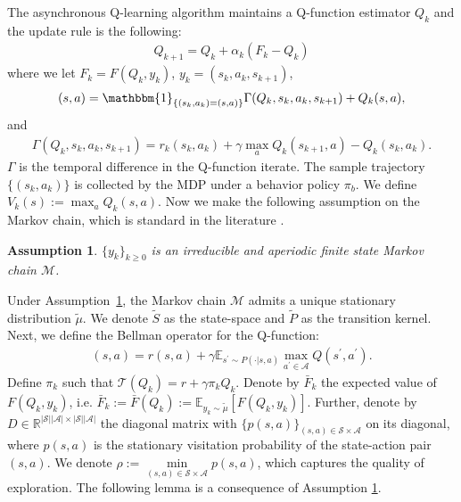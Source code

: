 \documentclass{opt2025} %
\newtheorem{assumption}[theorem]{Assumption}
\begin{document}
The asynchronous Q-learning algorithm maintains a Q-function estimator $Q_k$ and the update rule is the following:
\begin{align}
Q_{k+1} = Q_{k} + \alpha_k(F_k - Q_k) \label{update_Q}
\end{align}
where we let $F_k = F(Q_k, y_k)$, $y_k = (s_k,a_k,s_{k+1})$,
\begin{align}
[F(Q_k, s_k,a_k,s_{k+1})](s,a) = \mathbbm{1}_{\{ (s_k,a_k)=(s,a) \}} \Gamma(Q_k,s_k,a_k,s_{k+1}) + Q_k(s,a), \label{update_F}
\end{align}
and
\begin{align*}
\Gamma(Q_k,s_k,a_k,s_{k+1}) = r_k(s_k,a_k) + \gamma \max_{a} Q_k(s_{k+1},a) - Q_k(s_k,a_k).
\end{align*}
$\Gamma$ is the temporal difference in the Q-function iterate. The sample trajectory $\{(s_k,a_k)\}$ is collected by the MDP under a behavior policy $\pi_b$. We define $V_k(s) := \max_a Q_k(s,a)$. Now we make the following assumption on the Markov chain, which is standard in the literature \citep{zhang2024constant,zhang2022global, chen2021lyapunov, li2020sample, qu2020finite}.

\begin{assumption}
\label{asm_2}
$\{y_k\}_{k\geq0}$ is an irreducible and aperiodic finite state Markov chain $\mathcal{M}$.
\end{assumption}
Under Assumption~\ref{asm_2}, the Markov chain $\mathcal{M}$ admits a unique stationary distribution $\tilde{\mu}$. We denote $\tilde{S}$ as the state-space and $\tilde{P}$ as the transition kernel. Next, we define the Bellman operator for the Q-function:
\begin{align*}
[\mathcal{T}(Q)](s,a) = r(s,a) + \gamma \mathbb{E}_{s^{\prime}\sim P(\cdot |s,a)} \max_{a^{\prime}\in \mathcal{A}} Q(s^{\prime},a^{\prime}).
\end{align*}
Define $\pi_k$ such that $\mathcal{T}(Q_k) = r + \gamma \pi_k Q_k$. Denote by $\bar{F}_k$ the expected value of $F(Q_k,y_k)$, i.e. $\bar{F}_k := \bar{F}(Q_k) :=  \mathbb{E}_{y_k \sim \tilde{\mu}}[F(Q_k,y_k)]$. Further, denote by $D \in \mathbb{R}^{|\mathcal{S}||\mathcal{A}|\times |\mathcal{S}||\mathcal{A}|}$ the diagonal matrix with $\{ p(s,a)\}_{(s,a)\in \mathcal{S}\times \mathcal{A}}$ on its diagonal, where $p(s,a)$ is the stationary visitation probability of the state-action pair $(s,a)$. We denote $\rho:=\underset{(s,a)\in\mathcal{S}\times \mathcal{A}}{\min} p(s,a)$, which captures the quality of exploration. The following lemma is a consequence of Assumption \ref{asm_2}.
\end{document}
